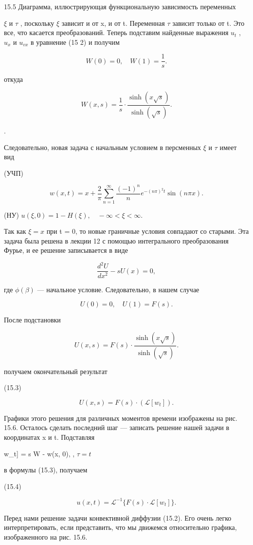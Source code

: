 \documentclass[
  ukrainian,
]{article}
\begin{document}
15.5 Диаграмма, иллюстрирующая функциональную зависимость переменных

\(\xi\) и \(\tau\) , поскольку \(\xi\) зависит и от x, и от t.
Переменная \(\tau\) зависит только от t. Это все, что касается
преобразований. Теперь подставим найденные выражения \(u_t\) , \(u_x\) и
\(u_{vx}\) в уравнение (15 2) и получим

\[
W(0) = 0, \quad W(1) = \frac{1}{s}.
\]

откуда

\[
W(x, s) = \frac{1}{s} \cdot \frac{\sinh(x \sqrt{s})}{\sinh(\sqrt{s})}.
\]

.

Следовательно, новая задача с начальным условием в персменных \(\xi\) и
\(\tau\) имеет вид

(УЧП)

\[
w(x, t) = x + \frac{2}{\pi} \sum_{n=1}^{\infty} \frac{(-1)^n}{n} e^{-(n\pi)^2 t} \sin(n\pi x).
\]

(НУ) \(u(\xi, 0) = 1 - H(\xi), \quad -\infty < \xi < \infty.\)

Так как \(\xi = x\) при t = 0, то новые граничные условия совпадают со
старыми. Эта задача была решена в лекции 12 с помощью интегрального
преобразования Фурье, и ее решение записывается в виде

\[
\frac{d^2 U}{dx^2} - s U(x) = 0,
\]

где \(\phi(\beta)\) --- начальное условие. Следовательно, в нашем случае

\[
U(0) = 0, \quad U(1) = F(s).
\]

После подстановки

\[
U(x, s) = F(s)\cdot \frac{\sinh(x \sqrt{s})}{\sinh(\sqrt{s})}.
\]

получаем окончательный результат

(15.3)

\[
U(x, s) = F(s) \cdot \left( \mathcal{L}[w_t] \right).
\]

Графики этого решения для различных моментов времени изображены на рис.
15.6. Осталось сделать последний шаг --- записать решение нашей задачи в
координатах x и t. Подставляя

\mathcal{L}{[}w\_t{]} = s W - w(x, 0), , \(\tau = t\)

в формулы (15.3), получаем

(15.4)

\[
u(x, t) = \mathcal{L}^{-1}\{F(s)\cdot \mathcal{L}[w_t]\}.
\]

Перед нами решение задачи конвективной диффузии (15.2). Его очень легко
интерпретировать, если представить, что мы движемся относительно
графика, изображенного на рис. 15.6.
\end{document}
